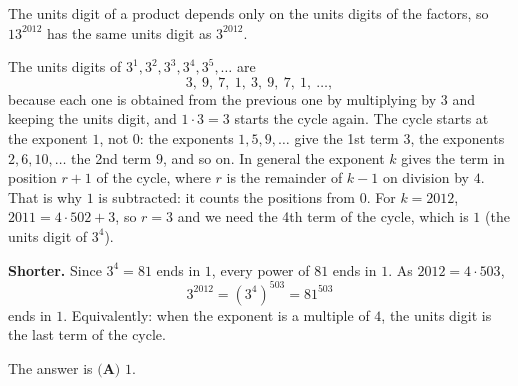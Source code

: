 The units digit of a product depends only on the units digits of the factors, so $13^{2012}$ has the same units digit as $3^{2012}$.

The units digits of $3^1,3^2,3^3,3^4,3^5,\dots$ are
\[3,\ 9,\ 7,\ 1,\ 3,\ 9,\ 7,\ 1,\ \dots,\]
because each one is obtained from the previous one by multiplying by $3$ and keeping the units digit, and $1\cdot3=3$ starts the cycle again. The cycle starts at the exponent $1$, not $0$: the exponents $1,5,9,\dots$ give the 1st term $3$, the exponents $2,6,10,\dots$ the 2nd term $9$, and so on. In general the exponent $k$ gives the term in position $r+1$ of the cycle, where $r$ is the remainder of $k-1$ on division by $4$. That is why $1$ is subtracted: it counts the positions from $0$. For $k=2012$, $2011=4\cdot502+3$, so $r=3$ and we need the 4th term of the cycle, which is $1$ (the units digit of $3^4$).

\textbf{Shorter.} Since $3^4=81$ ends in $1$, every power of $81$ ends in $1$. As $2012=4\cdot503$,
\[3^{2012}=\left(3^4\right)^{503}=81^{503}\]
ends in $1$. Equivalently: when the exponent is a multiple of $4$, the units digit is the last term of the cycle.

The answer is $\boxed{\textbf{(A) }1}$.
